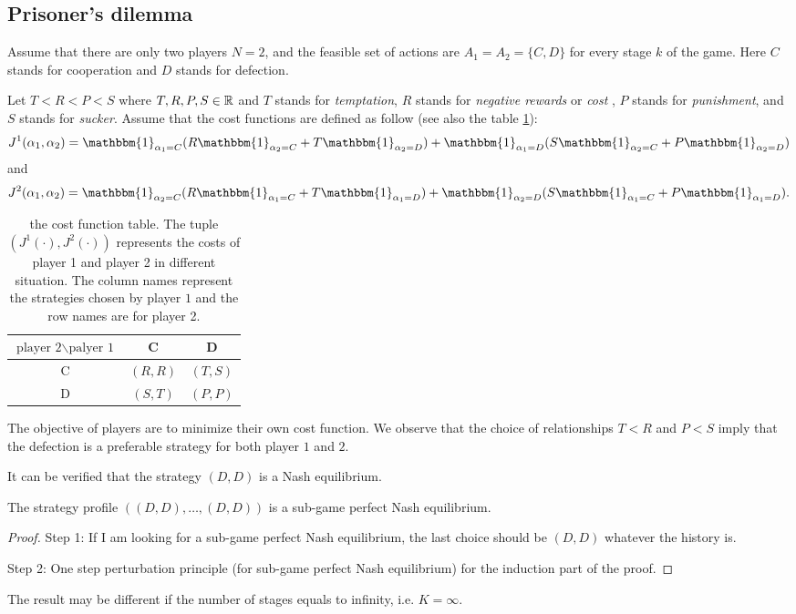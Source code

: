 \subsection{Prisoner's dilemma}

Assume that there are only two players $N=2$, and the feasible set of actions are $A_1 = A_2 = \{C,D\}$ for every stage $k$ of the game. Here $C$ stands for cooperation and $D$ stands for defection.

Let $T< R <P < S$ where $T, R,P,S \in \mathbb{R}$ and $T$ stands for \textit{temptation}, $R$ stands for  \textit{negative rewards} or \textit{cost} , $P$ stands for \textit{punishment}, and $S$ stands for \textit{sucker}. 
Assume that the cost functions are defined as follow (see also the table \ref{table:fictitious_play_prisoner_dilemma}):
$$
J^1(\alpha_1, \alpha_2) = \mathbbm{1}_{\alpha_1 = C} (R \mathbbm{1}_{\alpha_2 = C} + T \mathbbm{1}_{\alpha_2 = D} ) + \mathbbm{1}_{\alpha_1 = D} (S \mathbbm{1}_{\alpha_2=C} + P \mathbbm{1}_{\alpha_2=D} )
$$
and
$$
J^2(\alpha_1, \alpha_2) = \mathbbm{1}_{\alpha_2 = C} (R \mathbbm{1}_{\alpha_1 = C} + T \mathbbm{1}_{\alpha_1 = D} ) + \mathbbm{1}_{\alpha_2 = D} (S \mathbbm{1}_{\alpha_1=C} + P \mathbbm{1}_{\alpha_1=D} ).
$$
\begin{table}[h]
\centering
\begin{tabular}{|c|c|c|}
	\hline
	 $\text{player 2} \backslash \text{palyer 1}$& C & D \\
	 \hline
	 C & $(R,R)$ & $(T,S)$\\
	 \hline
	 D & $(S,T)$ & $(P,P)$\\
	 \hline
\end{tabular}
\caption{the cost function table. The tuple $(J^1(\cdot), J^2(\cdot))$ represents the costs of player 1 and player 2 in different situation. The column names represent the strategies chosen by player $1$ and the row names are for player 2.}
\label{table:fictitious_play_prisoner_dilemma}
\end{table}

The objective of players are to minimize their own cost function. We observe that the choice of relationships $T<R$ and $P<S$ imply that the defection is a preferable strategy for both player $1$ and $2$.

It can be verified that the strategy $(D,D)$ is a Nash equilibrium.

\begin{lemma}
	The strategy profile $((D,D), \ldots, (D,D))$ is a sub-game perfect Nash equilibrium.
\end{lemma}

\begin{proof}
	Step 1: If I am looking for a sub-game perfect Nash equilibrium, the last choice should be $(D,D)$ whatever the history is.
	
	Step 2: One step perturbation principle (for sub-game perfect Nash equilibrium) for the induction part of the proof.
\end{proof}

\begin{remark}
	The result may be different if the number of stages equals to infinity, i.e. $K=\infty$.
\end{remark}